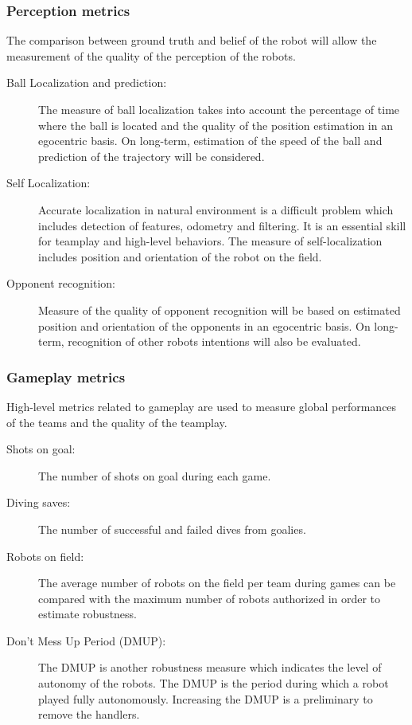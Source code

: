 \documentclass{article}
\begin{document}
\subsubsection{Perception metrics}

The comparison between ground truth and belief of the robot will allow the measurement of
the quality of the perception of the robots.

\begin{description}
\item[Ball Localization and prediction:] The measure of ball localization takes
  into account the percentage of time where the ball is located and the
  quality of the position estimation in an egocentric basis.
  On long-term, estimation of the speed of the ball and prediction of the trajectory will
  be considered.
\item[Self Localization:] Accurate localization in natural environment is a
  difficult problem which includes detection of features, odometry and filtering.
  It is an essential skill for teamplay and high-level behaviors.
  The measure of self-localization includes position and orientation of the robot
  on the field.
\item[Opponent recognition:] Measure of the quality of opponent recognition will
  be based on estimated position and orientation of the opponents in an egocentric
  basis.
  On long-term, recognition of other robots intentions will also be evaluated.
\end{description}

\subsubsection{Gameplay metrics}

High-level metrics related to gameplay are used to measure global performances
of the teams and the quality of the teamplay.

\begin{description}
\item[Shots on goal:] The number of shots on goal during each game.
\item[Diving saves:] The number of successful and failed dives from goalies.
\item[Robots on field:] The average number of robots on the field per team
  during games can be compared with the maximum number of robots authorized
  in order to estimate robustness.
\item[Don't Mess Up Period (DMUP):] The DMUP is another robustness measure which indicates the
  level of autonomy of the robots.
  The DMUP is the period during which a robot played fully autonomously.
  Increasing the DMUP is a preliminary to remove the handlers.
\end{description}
\end{document}
